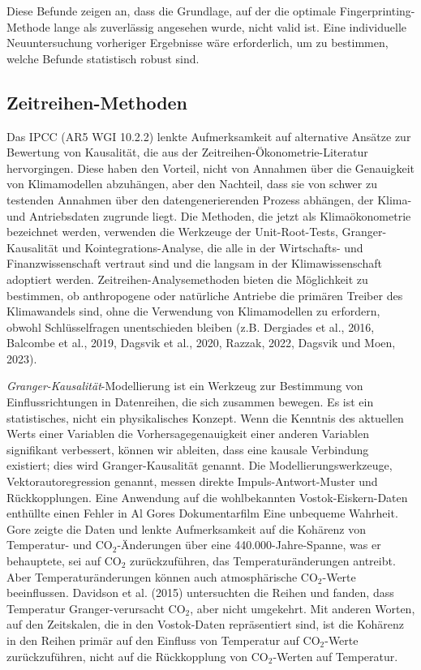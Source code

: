 \documentclass[12pt,paper=a4,DIV=12,parskip=never,chapterprefix=false,headings=standardclasses]{scrreprt}
\begin{document}
Diese Befunde zeigen an, dass die Grundlage, auf der die optimale Fingerprinting-Methode lange als zuverlässig angesehen wurde, nicht valid ist. Eine individuelle Neuuntersuchung vorheriger Ergebnisse wäre erforderlich, um zu bestimmen, welche Befunde statistisch robust sind.

\subsection{Zeitreihen-Methoden}
Das IPCC (AR5 WGI 10.2.2) lenkte Aufmerksamkeit auf alternative Ansätze zur Bewertung von Kausalität, die aus der Zeitreihen-Ökonometrie-Literatur hervorgingen. Diese haben den Vorteil, nicht von Annahmen über die Genauigkeit von Klimamodellen abzuhängen, aber den Nachteil, dass sie von schwer zu testenden Annahmen über den datengenerierenden Prozess abhängen, der Klima- und Antriebsdaten zugrunde liegt. Die Methoden, die jetzt als Klimaökonometrie bezeichnet werden, verwenden die Werkzeuge der Unit-Root-Tests, Granger-Kausalität und Kointegrations-Analyse, die alle in der Wirtschafts- und Finanzwissenschaft vertraut sind und die langsam in der Klimawissenschaft adoptiert werden. Zeitreihen-Analysemethoden bieten die Möglichkeit zu bestimmen, ob anthropogene oder natürliche Antriebe die primären Treiber des Klimawandels sind, ohne die Verwendung von Klimamodellen zu erfordern, obwohl Schlüsselfragen unentschieden bleiben (z.B. Dergiades et al., 2016, Balcombe et al., 2019, Dagsvik et al., 2020, Razzak, 2022, Dagsvik und Moen, 2023).

\emph{Granger-Kausalität}-Modellierung ist ein Werkzeug zur Bestimmung von Einflussrichtungen in Datenreihen, die sich zusammen bewegen. Es ist ein statistisches, nicht ein physikalisches Konzept. Wenn die Kenntnis des aktuellen Werts einer Variablen die Vorhersagegenauigkeit einer anderen Variablen signifikant verbessert, können wir ableiten, dass eine kausale Verbindung existiert; dies wird Granger-Kausalität genannt. Die Modellierungswerkzeuge, Vektorautoregression genannt, messen direkte Impuls-Antwort-Muster und Rückkopplungen. Eine Anwendung auf die wohlbekannten Vostok-Eiskern-Daten enthüllte einen Fehler in Al Gores Dokumentarfilm Eine unbequeme Wahrheit. Gore zeigte die Daten und lenkte Aufmerksamkeit auf die Kohärenz von Temperatur- und CO$_2$-Änderungen über eine 440.000-Jahre-Spanne, was er behauptete, sei auf CO$_2$ zurückzuführen, das Temperaturänderungen antreibt. Aber Temperaturänderungen können auch atmosphärische CO$_2$-Werte beeinflussen. Davidson et al. (2015) untersuchten die Reihen und fanden, dass Temperatur Granger-verursacht CO$_2$, aber nicht umgekehrt. Mit anderen Worten, auf den Zeitskalen, die in den Vostok-Daten repräsentiert sind, ist die Kohärenz in den Reihen primär auf den Einfluss von Temperatur auf CO$_2$-Werte zurückzuführen, nicht auf die Rückkopplung von CO$_2$-Werten auf Temperatur.
\end{document}
